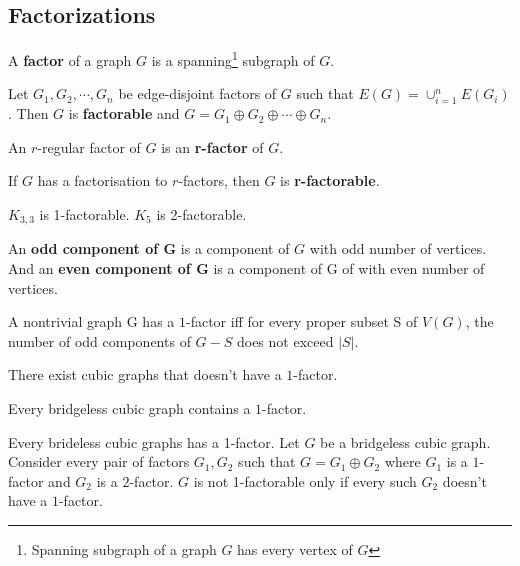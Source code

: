 \subsection{Factorizations}
\begin{definition}
	A \textbf{factor} of a graph $G$ is a spanning\footnote{Spanning subgraph of a graph $G$ has every vertex of $G$} subgraph of $G$.
\end{definition}

\begin{definition}
	Let $G_1, G_2, \cdots, G_n$ be edge-disjoint factors of $G$ such that $E(G) = \cup_{i = 1}^n E(G_i)$.
	Then $G$ is \textbf{factorable} and $G = G_1 \oplus G_2 \oplus \cdots \oplus G_n$.
\end{definition}

\begin{definition}
	An $r$-regular factor of $G$ is an \textbf{r-factor} of $G$.
\end{definition}

\begin{definition}
	If $G$ has a factorisation to $r$-factors, then $G$ is \textbf{r-factorable}.
\end{definition}

\begin{remark}
	$K_{3,3}$ is 1-factorable.
	$K_5$ is 2-factorable.
\end{remark}

\begin{definition}
	An \textbf{odd component of G} is a component of $G$ with odd number of vertices.
	And an \textbf{even component of G} is a component of G of with even number of vertices.
\end{definition}

\begin{theorem}[Tutte]
	A nontrivial graph G has a $1$-factor iff for every proper subset S of $V(G)$, the number of odd components of $G-S$ does not exceed $|S|$.
\end{theorem}

\begin{remark}
	There exist cubic graphs that doesn't have a $1$-factor.
\end{remark}

\begin{theorem}[Petersen]
	Every bridgeless cubic graph contains a $1$-factor.
\end{theorem}

\begin{remark}
	Every brideless cubic graphs has a 1-factor.
	Let $G$ be a bridgeless cubic graph.
	Consider every pair of factors $G_1, G_2$ such that $G = G_1 \oplus G_2$ where $G_1$ is a $1$-factor and $G_2$ is a $2$-factor.
	$G$ is not 1-factorable only if every such $G_2$ doesn't have a $1$-factor.
\end{remark}

